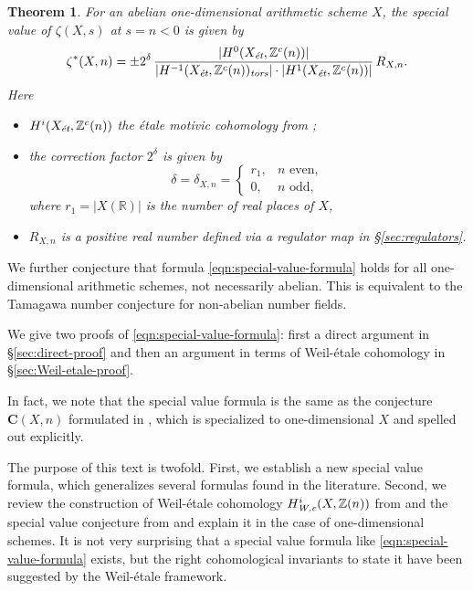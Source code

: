 \documentclass[draft]{article}
\newcommand{\RR}{\mathbb{R}}
\newcommand{\ZZ}{\mathbb{Z}}
\newcommand{\et}{\text{\it \'{e}t}}
\newcommand{\tors}{\text{\it tors}}
\newcommand{\Wc}{\text{\it W,c}}
\theoremstyle{myplain}
\newtheorem{theorem}{Theorem}[section]
\theoremstyle{mydefinition}
\begin{document}
\begin{theorem}
  \label{main-theorem}
  For an abelian one-dimensional arithmetic scheme $X$, the special value of
  $\zeta (X,s)$ at $s = n < 0$ is given by
  \begin{equation}
    \label{eqn:special-value-formula}
    \zeta^* (X,n) =
    \pm 2^\delta\,\frac{|H^0 (X_\et, \ZZ^c (n))|}{|H^{-1} (X_\et, \ZZ^c (n))_\tors| \cdot |H^1 (X_\et, \ZZ^c (n))|}\,R_{X,n}.
  \end{equation}
  Here
  \begin{itemize}
  \item $H^i (X_\et, \ZZ^c (n))$ the \'{e}tale motivic cohomology
    from \cite{Geisser-2010};

  \item the correction factor $2^\delta$ is given by
    \begin{equation}
      \label{eqn:delta}
      \delta = \delta_{X,n} =
      \begin{cases}
        r_1, & n \text{ even}, \\
        0, & n \text{ odd},
      \end{cases}
    \end{equation}
    where $r_1 = |X (\RR)|$ is the number of real places of $X$,

  \item $R_{X,n}$ is a positive real number defined
    via a regulator map in \S\ref{sec:regulators}.
  \end{itemize}
\end{theorem}

We further conjecture that formula \eqref{eqn:special-value-formula} holds for
all one-dimensional arithmetic schemes, not necessarily abelian. This is
equivalent to the Tamagawa number conjecture for non-abelian number fields.

\vspace{1em}

We give two proofs of \eqref{eqn:special-value-formula}: first a direct argument
in \S\ref{sec:direct-proof} and then an argument in terms of Weil-\'{e}tale
cohomology in \S\ref{sec:Weil-etale-proof}.

In fact, we note that the special value formula is the same as the conjecture
$\mathbf{C} (X,n)$ formulated in \cite{Beshenov-Weil-etale-2}, which is
specialized to one-dimensional $X$ and spelled out explicitly.

The purpose of this text is twofold. First, we establish a new special value
formula, which generalizes several formulas found in the literature. Second, we
review the construction of Weil-\'{e}tale cohomology $H^i_\Wc (X, \ZZ(n))$ from
\cite{Beshenov-Weil-etale-1} and the special value conjecture from
\cite{Beshenov-Weil-etale-2} and explain it in the case of one-dimensional
schemes. It is not very surprising that a special value formula like
\eqref{eqn:special-value-formula} exists, but the right cohomological invariants
to state it have been suggested by the Weil-\'{e}tale framework.
\end{document}
